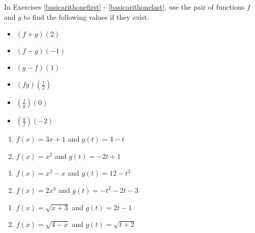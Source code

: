 \label{ExercisesforFunctionArithmetic}

In Exercises \ref{basicarithonefirst} - \ref{basicarithonelast}, use the pair of functions $f$ and $g$ to find the following values if they exist.

\begin{multicols}{3}
\begin{itemize}

\item  $(f+g)(2)$ 
\item  $(f-g)(-1)$
\item  $(g-f)(1)$

\end{itemize}
\end{multicols}

\begin{multicols}{3}
\begin{itemize}

\item  $(fg)\left(\frac{1}{2}\right)$
\item  $\left(\frac{f}{g}\right)(0)$
\item  $\left(\frac{g}{f}\right)\left(-2\right)$

\end{itemize}
\end{multicols}


\begin{multicols}{2}
\begin{enumerate}

\item  $f(x) = 3x+1$ and  $g(t) = 4-t$ \label{basicarithonefirst}
\item  $f(x) = x^2$ and $g(t) = -2t+1$

\setcounter{HW}{\value{enumi}}
\end{enumerate}
\end{multicols}

\begin{multicols}{2}
\begin{enumerate}
\setcounter{enumi}{\value{HW}}

\item  $f(x) = x^2 - x$ and  $g(t) = 12-t^2$
\item  $f(x) = 2x^3$ and $g(t) = -t^2-2t-3$

\setcounter{HW}{\value{enumi}}
\end{enumerate}
\end{multicols}

\begin{multicols}{2}
\begin{enumerate}
\setcounter{enumi}{\value{HW}}

\item  $f(x) = \sqrt{x+3}$ and  $g(t) = 2t-1$
\item  $f(x) = \sqrt{4-x}$ and $g(t) = \sqrt{t+2}$

\setcounter{HW}{\value{enumi}}
\end{enumerate}
\end{multicols}

